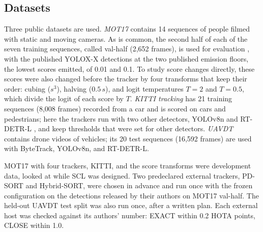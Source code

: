 \documentclass[pdflatex,sn-mathphys-num,iicol]{sn-jnl}
\newcommand{\scl}{SCL}
\begin{document}
\subsection{Datasets}\label{sec:data}
Three public datasets are used. \emph{MOT17} \cite{milan2016mot16} contains 14 sequences of
people filmed with static and moving cameras. As is common, the second half of each of the seven
training sequences, called val-half (2,652 frames), is used for evaluation \cite{zhang2022bytetrack},
with the published YOLOX-X detections \cite{ge2021yolox} at the two published emission floors, the
lowest scores emitted, of 0.01 and 0.1. To study score changes directly, these scores were also
changed before the tracker by four transforms that keep their order: cubing ($s^3$), halving
($0.5\,s$), and logit temperatures $T=2$ and $T=0.5$, which divide the logit of each score by $T$.
\emph{KITTI tracking} \cite{geiger2012kitti} has 21 training sequences (8,008 frames) recorded from
a car and is scored on cars and pedestrians; here the trackers run with two other detectors,
YOLOv8n \cite{jocher2023yolov8} and RT-DETR-L \cite{zhao2024rtdetr}, and keep thresholds that were
set for other detectors. \emph{UAVDT} \cite{du2018uavdt} contains drone videos of vehicles; its 20
test sequences (16,592 frames) are used with ByteTrack, YOLOv8n, and RT-DETR-L.

MOT17 with four trackers, KITTI, and the score transforms were development data, looked at while
\scl{} was designed. Two predeclared external trackers, PD-SORT and Hybrid-SORT, were chosen in
advance and run once with the frozen configuration on the detections released by their authors on
MOT17 val-half. The held-out UAVDT test split was also run once, after a written plan. Each
external host was checked against its authors' number: EXACT within 0.2 HOTA points, CLOSE within
1.0.
\end{document}
